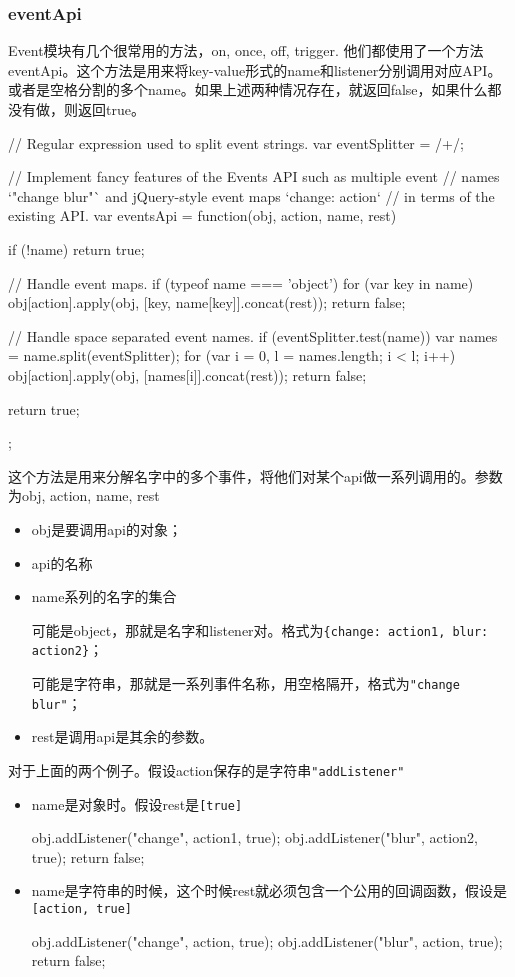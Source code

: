 \subsubsection{eventApi}

Event模块有几个很常用的方法，on, once, off, trigger. 他们都使用了一个方法eventApi。这个方法是用来将key-value形式的name和listener分别调用对应API。或者是空格分割的多个name。如果上述两种情况存在，就返回false，如果什么都没有做，则返回true。

\begin{JavaScript}[eventApi]
  // Regular expression used to split event strings.
  var eventSplitter = /\s+/;

  // Implement fancy features of the Events API such as multiple event
  // names `"change blur"` and jQuery-style event maps `{change: action}`
  // in terms of the existing API.
  var eventsApi = function(obj, action, name, rest) {
    if (!name) return true;

    // Handle event maps.
    if (typeof name === 'object') {
      for (var key in name) {
        obj[action].apply(obj, [key, name[key]].concat(rest));
      }
      return false;
    }

    // Handle space separated event names.
    if (eventSplitter.test(name)) {
      var names = name.split(eventSplitter);
      for (var i = 0, l = names.length; i < l; i++) {
        obj[action].apply(obj, [names[i]].concat(rest));
      }
      return false;
    }

    return true;
  };
\end{JavaScript}

这个方法是用来分解名字中的多个事件，将他们对某个api做一系列调用的。参数为obj, action, name, rest
\begin{itemize}
\item obj是要调用api的对象；
\item api的名称
\item name系列的名字的集合

可能是object，那就是名字和listener对。格式为\lstinline${change: action1, blur: action2}$；

可能是字符串，那就是一系列事件名称，用空格隔开，格式为\lstinline$"change blur"$；

\item rest是调用api是其余的参数。
\end{itemize}

对于上面的两个例子。假设action保存的是字符串\lstinline$"addListener"$
\begin{itemize}
\item name是对象时。假设rest是\lstinline$[true]$
\begin{JavaScript}
obj.addListener("change", action1, true);
obj.addListener("blur", action2, true);
return false;
\end{JavaScript}
\item name是字符串的时候，这个时候rest就必须包含一个公用的回调函数，假设是\lstinline$[action, true]$
\begin{JavaScript}
obj.addListener("change", action, true);
obj.addListener("blur", action, true);
return false;
\end{JavaScript}
\end{itemize}


